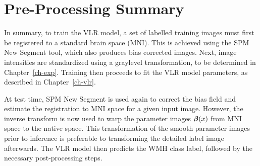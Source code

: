 \section{Pre-Processing Summary}
In summary, to train the VLR model,
a set of labelled training images must first be registered to a standard brain space (MNI).
This is achieved using the SPM New Segment tool, which also produces bias corrected images.
Next, image intensities are standardized using a graylevel transformation,
to be determined in Chapter~\ref{ch-exp}.
Training then proceeds to fit the VLR model parameters, as described in Chapter~\ref{ch-vlr}.
\par
At test time, SPM New Segment is used again to
correct the bias field and estimate the registration to MNI space for a given input image.
However, the inverse transform is now used to warp the parameter images $\bm{\beta}(x)$
from MNI space to the native space.
This transformation of the smooth parameter images prior to inference is preferable
to transforming the detailed label image afterwards.
The VLR model then predicts the WMH class label, followed by the necessary post-processing steps.
